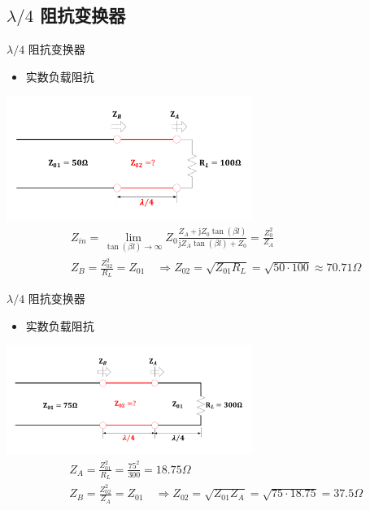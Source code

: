 \subsection{$\lambda/4$ 阻抗变换器}
\begin{frame}{$\lambda/4$ 阻抗变换器}
  \begin{itemize}
    \item 实数负载阻抗
  \end{itemize}
  \centering
  \includegraphics[width=8cm]{fig4-27.pdf}
  \begin{align*}
     & Z_{in}=\lim_{\tan(\beta l)\to\infty}Z_0\frac{Z_A+\mathrm{j}Z_0\tan(\beta l)}{\mathrm{j}Z_A\tan(\beta l)+Z_0}=\frac{Z_0^2}{Z_A} \\
     & Z_B=\frac{Z_{02}^2}{R_L}=Z_{01}\quad \Rightarrow Z_{02}=\sqrt{Z_{01}R_L}=\sqrt{50\cdot 100}\approx 70.71\Omega
  \end{align*}
\end{frame}

\begin{frame}{$\lambda/4$ 阻抗变换器}
  \begin{itemize}
    \item 实数负载阻抗
  \end{itemize}
  \centering
  \includegraphics[width=8cm]{fig4-28.pdf}
  \begin{align*}
     & Z_A=\frac{Z_{01}^2}{R_L}=\frac{75^2}{300}=18.75\Omega                                                    \\
     & Z_B=\frac{Z_{02}^2}{Z_A}=Z_{01}\quad \Rightarrow Z_{02}=\sqrt{Z_{01}Z_A}=\sqrt{75\cdot 18.75}=37.5\Omega
  \end{align*}
\end{frame}

